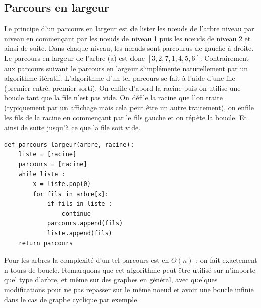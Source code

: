 \documentclass{report}
\begin{document}
\subsection{Parcours en largeur}
Le principe d'un parcours en largeur est de lister les nœuds de l'arbre niveau par niveau en commençant par les nœuds de niveau 1 puis les nœuds de niveau 2 et ainsi de suite. Dans chaque niveau, les nœuds sont parcourus de gauche à droite.
Le parcours en largeur de l'arbre (a) est donc $[3, 2, 7, 1, 4, 5, 6]$.
Contrairement aux parcours suivant le parcours en largeur s'implémente naturellement par un algorithme itératif.
L'algorithme d'un tel parcours se fait à l'aide d'une file (premier entré, premier sorti). On enfile d'abord la racine puis on utilise une boucle tant que la file n'est pas vide.
On défile la racine que l'on traite (typiquement par un affichage mais cela peut être un autre traitement), on enfile les fils de la racine en commençant par le fils gauche et on répète la boucle. Et ainsi de suite jusqu'à ce que la file soit vide.
\begin{lstlisting}
def parcours_largeur(arbre, racine):
	liste = [racine]
	parcours = [racine]
	while liste :
		x = liste.pop(0)
		for fils in arbre[x]:
			if fils in liste : 
				continue
			parcours.append(fils)
			liste.append(fils)
	return parcours
\end{lstlisting}
Pour les arbres la complexité d'un tel parcours est en $\Theta(n)$ : on fait exactement n tours de boucle. 
Remarquons que cet algorithme peut être utilisé sur n'importe quel type d'arbre, et même sur des graphes en général, avec quelques modifications pour ne pas repasser sur le même noeud et avoir une boucle infinie dans le cas de graphe cyclique par exemple.
\end{document}
